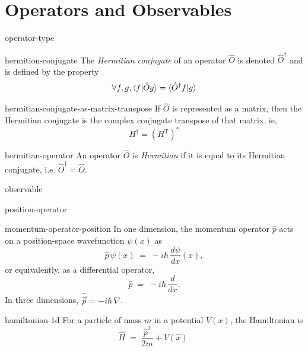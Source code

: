 \documentclass[12pt]{article}
\begin{document}
\section{Operators and Observables}

\begin{dfn}{operator-type}
  \todo
\end{dfn}

\begin{dfn}{hermition-conjugate}
  The \emph{Hermitian conjugate} of an operator $\hat{O}$ is denoted $\hat{O}^{\dagger}$ and is defined by the property
  \[\forall f, g, \braket{f|\hat{O}g} = \braket{\hat{O}^{\dagger}f|g}\]
\end{dfn}

\begin{rem}{hermitian-conjugate-as-matrix-transpose}
  If $\hat{O}$ is represented as a matrix, then the Hermitian conjugate is the complex conjugate transpose of that matrix. ie,
  \[H^\dagger = \left(H^{\text{T}}\right)^{*}\]
\end{rem}

\begin{dfn}{hermitian-operator}
  An operator $\hat{O}$ is \emph{Hermitian} if it is equal to its Hermitian conjugate, i.e. $\hat{O}^{\dagger} = \hat{O}$.
\end{dfn}

\begin{dfn}[Observable]{observable}
  \todo
\end{dfn}

\begin{dfn}{position-operator}
  \todo
\end{dfn}

\begin{dfn}{momentum-operator-position}
  In one dimension, the momentum operator $\hat{p}$ acts on a position-space wavefunction $\psi(x)$ as
  \[
    \hat{p}\,\psi(x) \;=\; -i\hbar\,\frac{d\psi}{dx}(x),
  \]
  or equivalently, as a differential operator,
  \[
    \hat{p} \;=\; -i\hbar\,\frac{d}{dx}.
  \]
  In three dimensions, $\hat{\vec{p}} = -i\hbar\,\nabla$.
\end{dfn}

\begin{dfn}[Hamiltonian in 1D]{hamiltonian-1d}
  For a particle of mass $m$ in a potential $V(x)$, the Hamiltonian is
  \[
    \hat{H} \;=\; \frac{\hat{p}^2}{2m} + V(\hat{x}).
  \]
\end{dfn}
\end{document}
